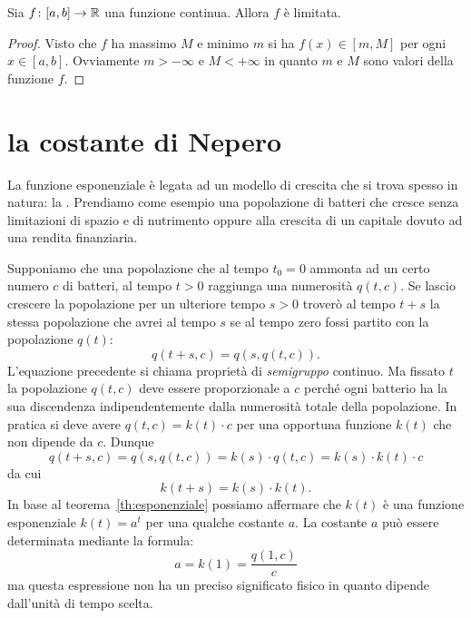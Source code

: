 \begin{corollary}
Sia $f\colon [a,b]\to \mathbb R$ una funzione continua. Allora $f$ è limitata.
\end{corollary}
\begin{proof}
Visto che $f$ ha massimo $M$ e minimo $m$ si ha $f(x)\in [m,M]$ per ogni $x\in[a,b]$.
Ovviamente $m>-\infty$ e $M<+\infty$ in quanto $m$ e $M$ sono valori della funzione $f$.
\end{proof}

\section{la costante di Nepero}

La funzione esponenziale è legata ad un modello di crescita che si trova spesso
in natura: la .
Prendiamo come esempio una popolazione di batteri che cresce senza
limitazioni di spazio e di nutrimento oppure
alla crescita di un capitale dovuto ad una rendita finanziaria.

Supponiamo che una popolazione che al tempo $t_0=0$
ammonta ad un certo numero $c$ di batteri, al tempo
$t>0$ raggiunga una numerosità $q(t,c)$.
Se lascio crescere la popolazione per un ulteriore
tempo $s>0$ troverò al tempo $t+s$ la stessa
popolazione che avrei al tempo $s$ se al tempo
zero fossi partito con la popolazione $q(t)$:
\[
  q(t+s,c) = q(s,q(t,c)).
\]
L'equazione precedente si chiama proprietà
di \emph{semigruppo}
%
continuo.
Ma fissato $t$ la popolazione $q(t,c)$ deve
essere proporzionale a $c$ perché ogni batterio
ha la sua discendenza indipendentemente dalla numerosità
totale della popolazione. In pratica
si deve avere $q(t,c) = k(t) \cdot c$ per una opportuna
funzione $k(t)$ che non dipende da $c$.
Dunque
\[
  q(t+s,c)
  = q(s,q(t,c))
  = k(s) \cdot q(t,c)
  = k(s) \cdot k(t) \cdot c
\]
da cui
\[
  k(t+s) = k(s) \cdot k(t).
\]
In base al teorema~\ref{th:esponenziale}
possiamo affermare
che $k(t)$ è una funzione esponenziale $k(t)=a^t$
per una qualche costante $a$.
La costante $a$ può essere determinata mediante la formula:
\[
  a = k(1) = \frac{q(1,c)}{c}
\]
ma questa espressione non ha un preciso significato fisico in quanto
dipende dall'unità di tempo scelta.

